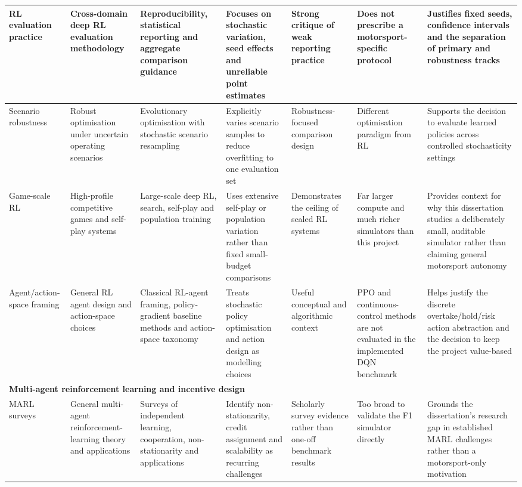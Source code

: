 \begin{appendices}
\begin{longtable}{|p{2.0cm}|p{2.1cm}|p{2.0cm}|p{2.0cm}|p{2.0cm}|p{2.2cm}|p{2.4cm}|}
\hline
RL evaluation practice \citep{henderson2018deep,agarwal2021statistical} & Cross-domain deep RL evaluation methodology & Reproducibility, statistical reporting and aggregate comparison guidance & Focuses on stochastic variation, seed effects and unreliable point estimates & Strong critique of weak reporting practice & Does not prescribe a motorsport-specific protocol & Justifies fixed seeds, confidence intervals and the separation of primary and robustness tracks \\
\hline
Scenario robustness \citep{sankary2018stochastic} & Robust optimisation under uncertain operating scenarios & Evolutionary optimisation with stochastic scenario resampling & Explicitly varies scenario samples to reduce overfitting to one evaluation set & Robustness-focused comparison design & Different optimisation paradigm from RL & Supports the decision to evaluate learned policies across controlled stochasticity settings \\
\hline
Game-scale RL \citep{silver2017alphagozero,silver2018alphazero,brown2018superhuman,vinyals2019alphastar,berner2019dota2} & High-profile competitive games and self-play systems & Large-scale deep RL, search, self-play and population training & Uses extensive self-play or population variation rather than fixed small-budget comparisons & Demonstrates the ceiling of scaled RL systems & Far larger compute and much richer simulators than this project & Provides context for why this dissertation studies a deliberately small, auditable simulator rather than claiming general motorsport autonomy \\
\hline
Agent/action-space framing \citep{ribeiro2002rlagents,schulman2017ppo,zhu2021actionspaces} & General RL agent design and action-space choices & Classical RL-agent framing, policy-gradient baseline methods and action-space taxonomy & Treats stochastic policy optimisation and action design as modelling choices & Useful conceptual and algorithmic context & PPO and continuous-control methods are not evaluated in the implemented DQN benchmark & Helps justify the discrete overtake/hold/risk action abstraction and the decision to keep the project value-based \\
\hline
\multicolumn{7}{|l|}{\textbf{Multi-agent reinforcement learning and incentive design}}\\
\hline
MARL surveys \citep{busoniu2008survey,hernandezleal2019survey,gronauer2022survey,ningxie2024marl,du2023cooperation} & General multi-agent reinforcement-learning theory and applications & Surveys of independent learning, cooperation, non-stationarity and applications & Identify non-stationarity, credit assignment and scalability as recurring challenges & Scholarly survey evidence rather than one-off benchmark results & Too broad to validate the F1 simulator directly & Grounds the dissertation's research gap in established MARL challenges rather than a motorsport-only motivation \\

\end{longtable}
\end{appendices}
